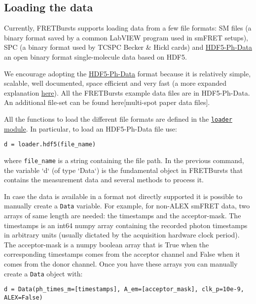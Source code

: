 \subsection{Loading the data}
Currently, FRETBursts supports loading data from a few file formats: SM files (a binary format saved by a common LabVIEW program used in smFRET setups), SPC (a binary format used by TCSPC Becker \& Hickl cards) and \href{https://github.com/tritemio/FRETBursts/wiki/HDF5-Ph-Data-format-0.2-Draft}{HDF5-Ph-Data}  an open binary format single-molecule data based on HDF5.

We encourage adopting the \href{https://github.com/tritemio/FRETBursts/wiki/HDF5-Ph-Data-format-0.2-Draft}{HDF5-Ph-Data} format because it is relatively simple, scalable, well documented, space efficient and very fast (a more expanded explanation \href{http://fretbursts.readthedocs.org/en/latest/HDF5_format.html}{here}). All the FRETBursts example data files are in HDF5-Ph-Data. An additional file-set can be found here[multi-spot paper data files].

All the functions to load the different file formats are defined in the \href{http://fretbursts.readthedocs.org/en/latest/loader.html}{\texttt{loader} module}. In particular, to load an HDF5-Ph-Data file use:

\begin{verbatim}
d = loader.hdf5(file_name)
\end{verbatim}

where \verb|file_name| is a string containing the file path. In the previous command, the variable `d` (of type `Data`) is the fundamental object in FRETBursts that contains the measurement data and several methods to process it.

In case the data is available in a format not directly supported it is possible to manually create a \verb|Data| variable. For example, for non-ALEX smFRET data, two arrays of same length are needed: the timestamps and the acceptor-mask. The timestamps is an int64 numpy array containing the recorded photon timestamps in arbitrary units (usually dictated by the acquisition hardware clock period). The acceptor-mask is a numpy boolean array that is True when the corresponding timestamps comes from the acceptor channel and False when it comes from the donor channel. Once you have these arrays you can manually create a \verb|Data| object with:

\begin{verbatim}
d = Data(ph_times_m=[timestamps], A_em=[acceptor_mask], clk_p=10e-9, ALEX=False)
\end{verbatim}

